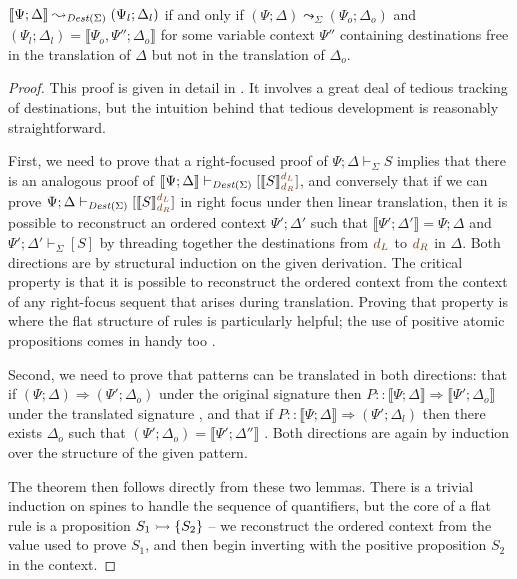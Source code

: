\begin{theorem}~\\\label{thm:destcorrect}
$\llbracket \Psi; \Delta \rrbracket \leadsto_{{\it Dest}(\Sigma)}
 (\Psi_l; \Delta_l)$ if and only if 
$(\Psi; \Delta) \leadsto_\Sigma (\Psi_o; \Delta_o)$ and
$(\Psi_l; \Delta_l) = \llbracket \Psi_o, \Psi''; \Delta_o \rrbracket$ 
for some variable 
context $\Psi''$ containing destinations free in the translation of
$\Delta$ but not in the translation of $\Delta_o$.
\end{theorem}

\begin{proof}
  This proof is given in detail in \cite[Appendix
  A]{simmons11logical}. It involves a great deal of tedious tracking
  of destinations, but the intuition behind that tedious development
  is reasonably straightforward.

  First, we need to prove that a right-focused proof of $\Psi; \Delta
  \vdash_{\Sigma} S$ implies that there is an analogous proof of
  $\llbracket \Psi; \Delta \rrbracket \vdash_{{\it Dest}(\Sigma)} [
  \llbracket S \rrbracket^{\lf{d_L}}_{\lf{d_R}} ]$, and conversely
  that if we can prove $\Psi; \Delta \vdash_{{\it Dest}(\Sigma)} [\llbracket
  S \rrbracket^{\lf{d_L}}_{\lf{d_R}}]$ in right focus under then
  linear translation, then it is possible to reconstruct an ordered
  context $\Psi'; \Delta'$ such that $\llbracket \Psi'; \Delta'
  \rrbracket = \Psi; \Delta$ and $\Psi'; \Delta'
  \vdash_{\Sigma} [S]$ by threading together the destinations from
  $\lf{d_L}$ to $\lf{d_R}$ in $\Delta$. Both directions are by
  structural induction on the given derivation. The critical property
  is that it is possible to reconstruct the ordered context from the
  context of any right-focus sequent that arises during translation.
  Proving that property is where the flat structure of rules is
  particularly helpful; the use of positive atomic propositions comes
  in handy too \cite[Lemma 1]{simmons11logical}.

  Second, we need to prove that patterns can be translated in both
  directions: that if $(\Psi; \Delta) \Longrightarrow (\Psi';
  \Delta_o)$ under the original signature then $P :: \llbracket \Psi;
  \Delta \rrbracket \Longrightarrow \llbracket \Psi'; \Delta_o \rrbracket$
  under the translated signature  \cite[Lemma 4]{simmons11logical}, and that if 
  $P :: \llbracket \Psi;
  \Delta \rrbracket \Longrightarrow (\Psi'; \Delta_l)$ then there 
  exists $\Delta_o$ such that 
  $(\Psi'; \Delta_o) = \llbracket \Psi'; \Delta'' \rrbracket$
  \cite[Lemma 5]{simmons11logical}. Both directions are again by induction
  over the structure of the given pattern.

  The theorem then follows directly from these two lemmas.  There
  is a trivial induction on spines to handle the sequence of
  quantifiers, but the core of a flat rule is a proposition $S_1
  \rightarrowtail \{ S_2 \}$ -- we reconstruct the ordered context from the
  value used to prove $S_1$, and then begin
  inverting with the positive proposition $S_2$ in the context.
\end{proof}


